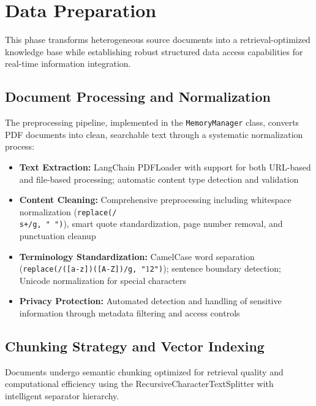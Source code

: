 \section{Data Preparation}
\label{sec:data_prep_s2}

This phase transforms heterogeneous source documents into a retrieval-optimized knowledge base while establishing robust structured data access capabilities for real-time information integration.

\subsection{Document Processing and Normalization}
\label{subsec:preprocess_s2}

The preprocessing pipeline, implemented in the \texttt{MemoryManager} class, converts PDF documents into clean, searchable text through a systematic normalization process:

\begin{itemize}
    \item \textbf{Text Extraction:} LangChain PDFLoader with support for both URL-based and file-based processing; automatic content type detection and validation
    \item \textbf{Content Cleaning:} Comprehensive preprocessing including whitespace normalization (\texttt{replace(/\\s+/g, " ")}), smart quote standardization, page number removal, and punctuation cleanup
    \item \textbf{Terminology Standardization:} CamelCase word separation (\texttt{replace(/([a-z])([A-Z])/g, "$1 $2")}); sentence boundary detection; Unicode normalization for special characters
    \item \textbf{Privacy Protection:} Automated detection and handling of sensitive information through metadata filtering and access controls
\end{itemize}

\subsection{Chunking Strategy and Vector Indexing}
\label{subsec:chunk_index_s2}

Documents undergo semantic chunking optimized for retrieval quality and computational efficiency using the RecursiveCharacterTextSplitter with intelligent separator hierarchy.

